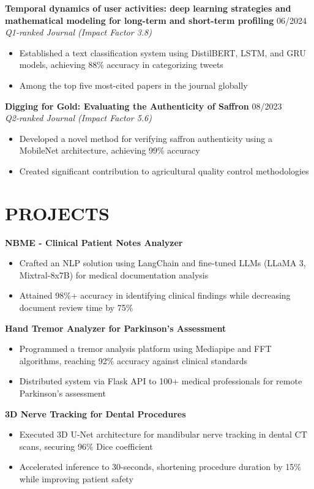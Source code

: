 \documentclass[11pt]{article}
\begin{document}
\textbf{Temporal dynamics of user activities: deep learning strategies and mathematical modeling for long-term and short-term profiling} \hfill 06/2024\\
\textit{Q1-ranked Journal (Impact Factor 3.8)}
\begin{itemize}
\item Established a text classification system using DistilBERT, LSTM, and GRU models, achieving 88\% accuracy in categorizing tweets
\item Among the top five most-cited papers in the journal globally
\end{itemize}

\textbf{Digging for Gold: Evaluating the Authenticity of Saffron} \hfill 08/2023\\
\textit{Q2-ranked Journal (Impact Factor 5.6)}
\begin{itemize}
\item Developed a novel method for verifying saffron authenticity using a MobileNet architecture, achieving 99\% accuracy
\item Created significant contribution to agricultural quality control methodologies
\end{itemize}

\section{PROJECTS}

\textbf{NBME - Clinical Patient Notes Analyzer}
\begin{itemize}
\item Crafted an NLP solution using LangChain and fine-tuned LLMs (LLaMA 3, Mixtral-8x7B) for medical documentation analysis
\item Attained 98\%+ accuracy in identifying clinical findings while decreasing document review time by 75\%
\end{itemize}

\textbf{Hand Tremor Analyzer for Parkinson's Assessment}
\begin{itemize}
\item Programmed a tremor analysis platform using Mediapipe and FFT algorithms, reaching 92\% accuracy against clinical standards
\item Distributed system via Flask API to 100+ medical professionals for remote Parkinson's assessment
\end{itemize}

\textbf{3D Nerve Tracking for Dental Procedures}
\begin{itemize}
\item Executed 3D U-Net architecture for mandibular nerve tracking in dental CT scans, securing 96\% Dice coefficient
\item Accelerated inference to 30-seconds, shortening procedure duration by 15\% while improving patient safety
\end{itemize}
\end{document}
